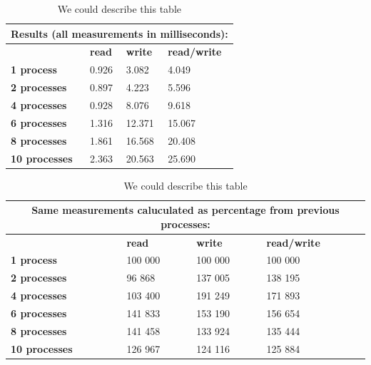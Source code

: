 \documentclass[final,a4paper]{article}
\begin{document}
\begin{table}[h]
  \begin{tabular}{|l|l|l|l|}
    \hline
    \multicolumn{4}{|c|}{\bf Results (all measurements in milliseconds):}\\
    \hline
    \hline
    & {\bf read } & { \bf write } & { \bf read/write } \\
    \hline
    { \bf 1 process }    & 0.926 &  3.082 &  4.049 \\
    \hline
    { \bf 2 processes }  & 0.897 &  4.223 &  5.596 \\
    \hline
    { \bf 4 processes }  & 0.928 &  8.076 &  9.618 \\
    \hline
    { \bf 6 processes }  & 1.316 & 12.371 & 15.067 \\
    \hline
    { \bf 8 processes }  & 1.861 & 16.568 & 20.408 \\
    \hline
    { \bf 10 processes } & 2.363 & 20.563 & 25.690 \\
    \hline
  \end{tabular}
  \caption{We could describe this table}
  \label{table1}
\end{table}

\begin{table}[h]
  \begin{tabular}{|l|l|l|l|}
    \hline
    \multicolumn{4}{|c|}{\bf Same measurements caluculated as percentage from previous processes:}\\
    \hline
    \hline
    & {\bf read } & { \bf write } & { \bf read/write } \\
    \hline
    { \bf 1 process }    & 100 000 & 100 000 & 100 000 \\
    \hline
    { \bf 2 processes }  &  96 868 & 137 005 & 138 195 \\
    \hline
    { \bf 4 processes }  & 103 400 & 191 249 & 171 893 \\
    \hline
    { \bf 6 processes }  & 141 833 & 153 190 & 156 654 \\
    \hline
    { \bf 8 processes }  & 141 458 & 133 924 & 135 444 \\
    \hline
    { \bf 10 processes } & 126 967 & 124 116 & 125 884 \\
    \hline
  \end{tabular}
  \caption{We could describe this table}
  \label{table2}
\end{table}

\end{document}

